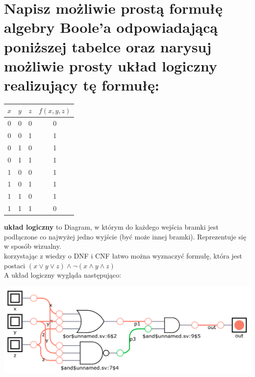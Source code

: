 \documentclass{article}
\begin{document}
\section{Napisz możliwie prostą formułę algebry Boole’a odpowiadającą poniższej tabelce oraz narysuj możliwie
prosty układ logiczny realizujący tę formułę:}
\begin{center}
\begin{tabular}{|c|c|c|c|} 
	 \hline
	 $x$ & $y$ & $z$ & $f(x, y, z)$\\ 
	 \hline \hline
	 0 & 0 & 0 & 0 \\ 
	 \hline
	 0 & 0 & 1 & 1\\ 
	 \hline
	 0 & 1 & 0 & 1\\
	 \hline
	 0 & 1 & 1 & 1\\ 
	 \hline
	 1 & 0 & 0 & 1\\ 
	 \hline
	 1 & 0 & 1 & 1\\ 
	 \hline
	 1 & 1 & 0 & 1\\ 
	 \hline
	 1 & 1 & 1 & 0\\ 
	 \hline
\end{tabular}

\end{center}
\textbf{układ logiczny} to Diagram, w którym do każdego wejścia bramki jest podłączone co najwyżej jedno wyjście (być może innej bramki). Reprezentuje się w sposób wizualny.\\
korzystając z wiedzy o DNF i CNF łatwo można wyznaczyć formułę, która jest postaci $(x \vee y \vee z) \wedge \neg (x \wedge y \wedge z)$\\
A układ logiczny wygląda następująco:
\begin{center}
	\includegraphics[scale=0.2]{./L01Z07.png}
\end{center}
\end{document}
